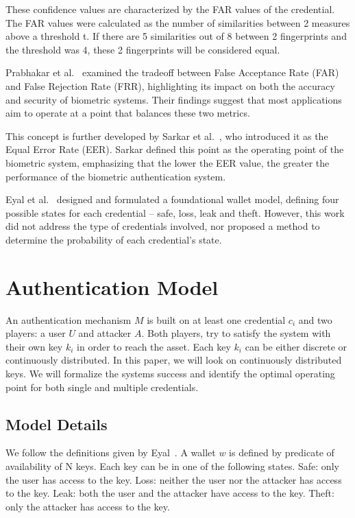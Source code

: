 \documentclass{article}
\begin{document}
These confidence values are characterized by the FAR values of the credential. The FAR values were calculated as the number of similarities between 2 measures above a threshold t. If there are 5 similarities out of 8 between 2 fingerprints and the threshold was 4, these 2 fingerprints will be considered equal.

Prabhakar et al.~\cite{prabhakar2003} examined the tradeoff between False Acceptance Rate (FAR) and False Rejection Rate (FRR), highlighting its impact on both the accuracy and security of biometric systems. Their findings suggest that most applications aim to operate at a point that balances these two metrics.

This concept is further developed by Sarkar et al.~\cite{sarkar2020}, who introduced it as the Equal Error Rate (EER). Sarkar defined this point as the operating point of the biometric system, emphasizing that the lower the EER value, the greater the performance of the biometric authentication system.

Eyal et al.~\cite{Eyal2021} designed and formulated a foundational wallet model, defining four possible states for each credential – safe, loss, leak and theft. However, this work did not address the type of credentials involved, nor proposed a method to determine the probability of each credential’s state.
\section{Authentication Model}
An authentication mechanism $M$ is built on at least one credential $c_i$ and two players: a user $U$ and attacker $A$. Both players, try to satisfy the system with their own key $k_i$ in order to reach the asset. Each key $k_i$ can be either discrete or continuously distributed. In this paper, we will look on continuously distributed keys. We will formalize the systems success and identify the optimal operating point for both single and multiple credentials.
\subsection{Model Details}
We follow the definitions given by Eyal~\cite{Eyal2021}. A wallet $w$ is defined by predicate of availability of N keys. Each key can be in one of the following states. Safe: only the user has access to the key. Loss: neither the user nor the attacker has access to the key. Leak: both the user and the attacker have access to the key. Theft: only the attacker has access to the key.
\end{document}
